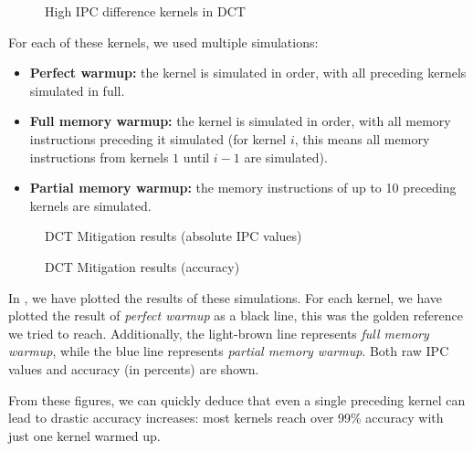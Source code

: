 \begin{figure}
    \centering
    \caption{High IPC difference kernels in DCT}
    \label{fig:dct_kernels}
\end{figure}

For each of these kernels, we used multiple simulations:
\begin{itemize}
    \item \textbf{Perfect warmup:} the kernel is simulated in order, with all preceding kernels simulated in full.
    \item \textbf{Full memory warmup:} the kernel is simulated in order, with all memory instructions preceding it simulated (for kernel $i$, this means all memory instructions from kernels $1$ until $i - 1$ are simulated).
    \item \textbf{Partial memory warmup:} the memory instructions of up to 10 preceding kernels are simulated.
\end{itemize}

\begin{figure}[t]
    \centering
    \caption{DCT Mitigation results (absolute IPC values)}
    \label{fig:mitig_abs}
\end{figure}

\begin{figure}[t]
    \centering
    \caption{DCT Mitigation results (accuracy)}
    \label{fig:mitig_acc}
\end{figure}

In , we have plotted the results of these simulations.
For each kernel, we have plotted the result of \textit{perfect warmup} as a black line, this was the golden reference we tried to reach.
Additionally, the light-brown line represents \textit{full memory warmup}, while the blue line represents \textit{partial memory warmup}.
Both raw IPC values and accuracy (in percents) are shown.

From these figures, we can quickly deduce that even a single preceding kernel can lead to drastic accuracy increases: most kernels reach over 99\% accuracy with just one kernel warmed up.

